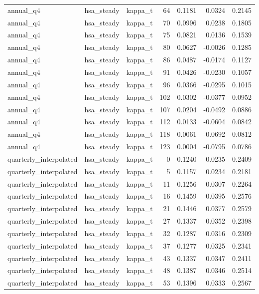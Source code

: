 \begin{tabular}{lllrrrr}
annual\_q4 & hsa\_steady & kappa\_t & 64 & 0.1181 & 0.0324 & 0.2145 \\
annual\_q4 & hsa\_steady & kappa\_t & 70 & 0.0996 & 0.0238 & 0.1805 \\
annual\_q4 & hsa\_steady & kappa\_t & 75 & 0.0821 & 0.0136 & 0.1539 \\
annual\_q4 & hsa\_steady & kappa\_t & 80 & 0.0627 & -0.0026 & 0.1285 \\
annual\_q4 & hsa\_steady & kappa\_t & 86 & 0.0487 & -0.0174 & 0.1127 \\
annual\_q4 & hsa\_steady & kappa\_t & 91 & 0.0426 & -0.0230 & 0.1057 \\
annual\_q4 & hsa\_steady & kappa\_t & 96 & 0.0366 & -0.0295 & 0.1015 \\
annual\_q4 & hsa\_steady & kappa\_t & 102 & 0.0302 & -0.0377 & 0.0952 \\
annual\_q4 & hsa\_steady & kappa\_t & 107 & 0.0204 & -0.0492 & 0.0886 \\
annual\_q4 & hsa\_steady & kappa\_t & 112 & 0.0133 & -0.0604 & 0.0842 \\
annual\_q4 & hsa\_steady & kappa\_t & 118 & 0.0061 & -0.0692 & 0.0812 \\
annual\_q4 & hsa\_steady & kappa\_t & 123 & 0.0004 & -0.0795 & 0.0786 \\
quarterly\_interpolated & hsa\_steady & kappa\_t & 0 & 0.1240 & 0.0235 & 0.2409 \\
quarterly\_interpolated & hsa\_steady & kappa\_t & 5 & 0.1157 & 0.0234 & 0.2181 \\
quarterly\_interpolated & hsa\_steady & kappa\_t & 11 & 0.1256 & 0.0307 & 0.2264 \\
quarterly\_interpolated & hsa\_steady & kappa\_t & 16 & 0.1459 & 0.0395 & 0.2576 \\
quarterly\_interpolated & hsa\_steady & kappa\_t & 21 & 0.1446 & 0.0377 & 0.2579 \\
quarterly\_interpolated & hsa\_steady & kappa\_t & 27 & 0.1337 & 0.0352 & 0.2398 \\
quarterly\_interpolated & hsa\_steady & kappa\_t & 32 & 0.1287 & 0.0316 & 0.2309 \\
quarterly\_interpolated & hsa\_steady & kappa\_t & 37 & 0.1277 & 0.0325 & 0.2341 \\
quarterly\_interpolated & hsa\_steady & kappa\_t & 43 & 0.1337 & 0.0347 & 0.2411 \\
quarterly\_interpolated & hsa\_steady & kappa\_t & 48 & 0.1387 & 0.0346 & 0.2514 \\
quarterly\_interpolated & hsa\_steady & kappa\_t & 53 & 0.1396 & 0.0333 & 0.2567 \\

\end{tabular}
